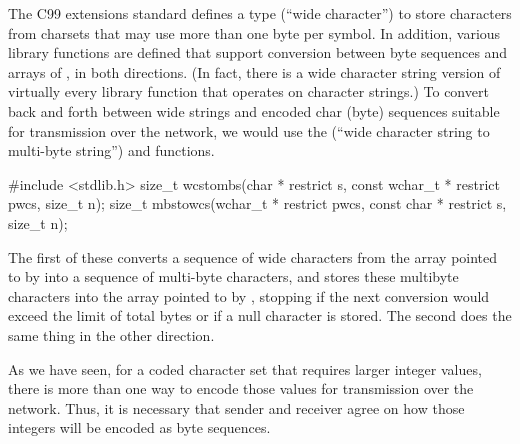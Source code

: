 The C99 extensions standard defines a type  (``wide
character'') to store characters from charsets that may use more than one
byte per symbol. In addition, various library functions are defined
that support conversion between byte sequences and arrays of
, in 
both directions.  (In fact, there is a wide character string version
of virtually every library function that operates on character
strings.)
To convert back and forth between wide strings and encoded char (byte)
sequences suitable for transmission over the network, we would use
the  (``wide character
string to multi-byte string'') and  functions.
\begin{inlinecode}
  #include <stdlib.h>
  size_t wcstombs(char * restrict s, const wchar_t * restrict pwcs, size_t n);
  size_t mbstowcs(wchar_t * restrict pwcs, const char * restrict s, size_t n);
\end{inlinecode}
The first of these converts a sequence of wide characters from the
array pointed to by  into a sequence of multi-byte
characters, and stores these multibyte characters into the array
pointed to by , stopping if the next conversion would exceed
the limit of  total bytes or if a null character is stored.
The second does the same thing in the other direction.

As we have seen, for a coded character set that requires larger
integer values, there is more than one way to encode those
values for transmission over the network.
Thus, it is necessary that sender and receiver agree on how those integers
will be encoded as byte sequences.

